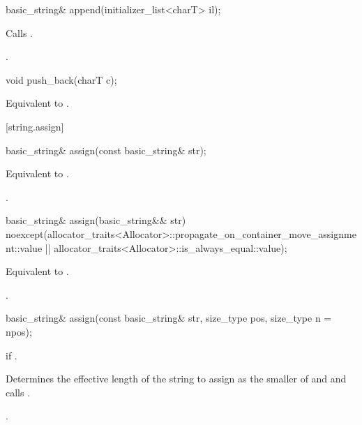 %
\begin{itemdecl}
basic_string& append(initializer_list<charT> il);
\end{itemdecl}

\begin{itemdescr}
\pnum
\effects Calls .

\pnum
\returns
{}.
\end{itemdescr}

%
\begin{itemdecl}
void push_back(charT c);
\end{itemdecl}

\begin{itemdescr}
\pnum
\effects
Equivalent to
.
\end{itemdescr}

[string.assign]{}

%
\begin{itemdecl}
basic_string& assign(const basic_string& str);
\end{itemdecl}

\begin{itemdescr}
\pnum
\effects Equivalent to .

\pnum
\returns
{}.
\end{itemdescr}

%
\begin{itemdecl}
basic_string& assign(basic_string&& str)
  noexcept(allocator_traits<Allocator>::propagate_on_container_move_assignment::value ||
           allocator_traits<Allocator>::is_always_equal::value);
\end{itemdecl}

\begin{itemdescr}
\pnum
\effects Equivalent to .

\pnum
\returns
{}.
\end{itemdescr}


%
\begin{itemdecl}
basic_string&
  assign(const basic_string& str, size_type pos,
         size_type n = npos);
\end{itemdecl}

\begin{itemdescr}
\pnum
\throws
{}
if
.

\pnum
\effects
Determines the effective length 
of the string to assign as the smaller of  and
 and calls
.

\pnum
\returns
{}.
\end{itemdescr}

